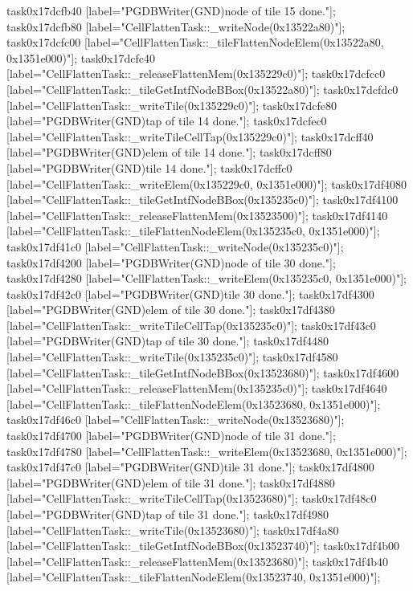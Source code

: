 {	task0x17dcfb40 [label="PGDBWriter(GND)\nCell node of tile 15 done."];
	task0x17dcfb80 [label="CellFlattenTask::_writeNode(0x13522a80)"];
	task0x17dcfc00 [label="CellFlattenTask::_tileFlattenNodeElem(0x13522a80, 0x1351e000)"];
	task0x17dcfc40 [label="CellFlattenTask::_releaseFlattenMem(0x135229c0)"];
	task0x17dcfcc0 [label="CellFlattenTask::_tileGetIntfNodeBBox(0x13522a80)"];
	task0x17dcfdc0 [label="CellFlattenTask::_writeTile(0x135229c0)"];
	task0x17dcfe80 [label="PGDBWriter(GND)\nCell tap of tile 14 done."];
	task0x17dcfec0 [label="CellFlattenTask::_writeTileCellTap(0x135229c0)"];
	task0x17dcff40 [label="PGDBWriter(GND)\nCell elem of tile 14 done."];
	task0x17dcff80 [label="PGDBWriter(GND)\nCell tile 14 done."];
	task0x17dcffc0 [label="CellFlattenTask::_writeElem(0x135229c0, 0x1351e000)"];
	task0x17df4080 [label="CellFlattenTask::_tileGetIntfNodeBBox(0x135235c0)"];
	task0x17df4100 [label="CellFlattenTask::_releaseFlattenMem(0x13523500)"];
	task0x17df4140 [label="CellFlattenTask::_tileFlattenNodeElem(0x135235c0, 0x1351e000)"];
	task0x17df41c0 [label="CellFlattenTask::_writeNode(0x135235c0)"];
	task0x17df4200 [label="PGDBWriter(GND)\nCell node of tile 30 done."];
	task0x17df4280 [label="CellFlattenTask::_writeElem(0x135235c0, 0x1351e000)"];
	task0x17df42c0 [label="PGDBWriter(GND)\nCell tile 30 done."];
	task0x17df4300 [label="PGDBWriter(GND)\nCell elem of tile 30 done."];
	task0x17df4380 [label="CellFlattenTask::_writeTileCellTap(0x135235c0)"];
	task0x17df43c0 [label="PGDBWriter(GND)\nCell tap of tile 30 done."];
	task0x17df4480 [label="CellFlattenTask::_writeTile(0x135235c0)"];
	task0x17df4580 [label="CellFlattenTask::_tileGetIntfNodeBBox(0x13523680)"];
	task0x17df4600 [label="CellFlattenTask::_releaseFlattenMem(0x135235c0)"];
	task0x17df4640 [label="CellFlattenTask::_tileFlattenNodeElem(0x13523680, 0x1351e000)"];
	task0x17df46c0 [label="CellFlattenTask::_writeNode(0x13523680)"];
	task0x17df4700 [label="PGDBWriter(GND)\nCell node of tile 31 done."];
	task0x17df4780 [label="CellFlattenTask::_writeElem(0x13523680, 0x1351e000)"];
	task0x17df47c0 [label="PGDBWriter(GND)\nCell tile 31 done."];
	task0x17df4800 [label="PGDBWriter(GND)\nCell elem of tile 31 done."];
	task0x17df4880 [label="CellFlattenTask::_writeTileCellTap(0x13523680)"];
	task0x17df48c0 [label="PGDBWriter(GND)\nCell tap of tile 31 done."];
	task0x17df4980 [label="CellFlattenTask::_writeTile(0x13523680)"];
	task0x17df4a80 [label="CellFlattenTask::_tileGetIntfNodeBBox(0x13523740)"];
	task0x17df4b00 [label="CellFlattenTask::_releaseFlattenMem(0x13523680)"];
	task0x17df4b40 [label="CellFlattenTask::_tileFlattenNodeElem(0x13523740, 0x1351e000)"];
}
